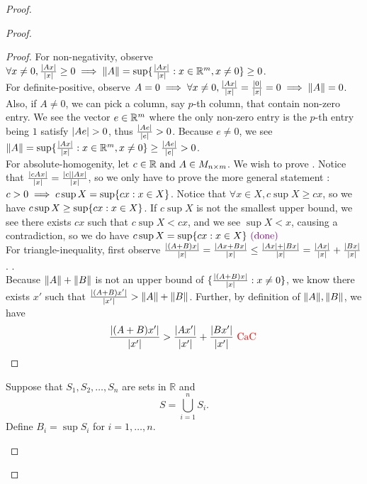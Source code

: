 \documentclass{report}
\begin{document}
\begin{proof}
\begin{proof}
\begin{proof}
For non-negativity, observe $\forall x\neq 0,\frac{|Ax|}{|x|}\geq 0 \implies \| A \|=\sup \{ \frac{|Ax|}{|x|}:x \in \mathbb{R}^m, x\neq 0 \}\geq 0$.\\

For definite-positive, observe $A=0\implies \forall x\neq 0, \frac{|Ax|}{|x|}=\frac{|0|}{|x|}=0\implies \| A \|=0$. Also, if $A\neq 0$, we can pick a column, say $p$-th column, that contain non-zero entry. We see the vector $e\in \mathbb{R}^m$ where the only non-zero entry is the  $p$-th entry being $1$ satisfy $\abso{Ae}>0$, thus $\frac{|Ae|}{|e|}>0$. Because $e\neq 0$, we see $\| A \|=\sup \{ \frac{|Ax|}{|x|}:x\in\mathbb{R}^m,x\neq 0 \}\geq \frac{|Ae|}{|e|}>0$.\\

For absolute-homogenity, let $c \in \mathbb{R}\text{ and }A\in M_{n\times m}$. We wish to prove . Notice that $\frac{|cAx|}{|x|}=\frac{|c||Ax|}{|x|}$, so we only have to prove the more general statement : $c>0 \implies c \sup X= \sup \{ cx:x\in X \}$. Notice that $\forall x \in X, c \sup X\geq cx$, so we have $c\sup X\geq \sup \{ cx:x\in X \}$. If $c\sup X$ is not the smallest upper bound, we see there exists $cx$ such that $c\sup X<cx$, and we see $\sup X<x$, causing a contradiction, so we do have $c\sup X=\sup \{ cx:x\in X \}\textcolor{violet}{\text{ (done) }}$   \\

For triangle-inequality, first observe $\frac{|(A+B)x|}{|x|}=\frac{|Ax+Bx|}{|x|}\leq \frac{|Ax|+|Bx|}{|x|}=\frac{|Ax|}{|x|}+\frac{|Bx|}{|x|}$. .\\

Because $\| A \|+\| B \|$ is not an upper bound of $\{ \frac{|(A+B)x|}{|x|}:x\neq 0 \}$, we know there exists $x'$ such that  $\frac{|(A+B)x'|}{|x'|}>\| A \|+\| B \|$. Further, by definition of $\| A \|,\| B \|$, we have
\begin{equation}
\frac{|(A+B)x'|}{|x'|}>\frac{|Ax'|}{|x'|}+\frac{|Bx'|}{|x'|}\text{ \textcolor{red}{CaC} }
\end{equation}
\end{proof}

\begin{question}{}{}
Suppose that \(S_1, S_2, \ldots, S_n\) are sets in \(\mathbb{R}\) and 
\[ S = \bigcup_{i=1}^{n} S_i. \]
Define \(B_i = \sup S_i\) for \(i = 1, \ldots, n\).


\end{question}
\end{proof}
\end{proof}
\end{document}
